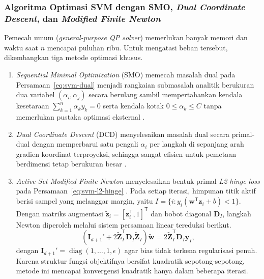 \subsubsection{Algoritma Optimasi SVM dengan SMO, \textit{Dual Coordinate Descent}, dan \textit{Modified Finite Newton}}

Pemecah umum (\textit{general-purpose QP solver}) memerlukan banyak memori dan waktu saat $n$ mencapai puluhan ribu. Untuk mengatasi beban tersebut, dikembangkan tiga metode optimasi khusus.
\begin{enumerate}
    \item \textit{Sequential Minimal Optimization} (SMO) memecah masalah dual pada Persamaan~\eqref{eq:svm-dual} menjadi rangkaian submasalah analitik berukuran dua variabel $(\alpha_i, \alpha_j)$ secara berulang sambil mempertahankan kendala kesetaraan $\sum_{k=1}^n \alpha_k y_k = 0$ serta kendala kotak $0 \le \alpha_k \le C$ tanpa memerlukan pustaka optimasi eksternal \cite{platt1998smo}.
    \item \textit{Dual Coordinate Descent} (DCD) menyelesaikan masalah dual secara primal-dual dengan memperbarui satu pengali $\alpha_i$ per langkah di sepanjang arah gradien koordinat terproyeksi, sehingga sangat efisien untuk pemetaan berdimensi tetap berukuran besar \cite{hsieh2008dcd}.
    \item \textit{Active-Set Modified Finite Newton} menyelesaikan bentuk primal \textit{L2-hinge loss} pada Persamaan~\eqref{eq:svm-l2-hinge} \cite{keerthi2005newton}. Pada setiap iterasi, himpunan titik aktif berisi sampel yang melanggar margin, yaitu $I = \{i : y_i (\mathbf{w}^{\mathsf{T}}\mathbf{z}_i + b) < 1\}$. Dengan matriks augmentasi $\tilde{\mathbf{z}}_i = [\mathbf{z}_i^{\mathsf{T}}, 1]^{\mathsf{T}}$ dan bobot diagonal $\mathbf{D}_I$, langkah Newton diperoleh melalui sistem persamaan linear tereduksi berikut.
    \begin{equation}
        \left(\mathbf{I}_{d+1}' + 2 \tilde{\mathbf{Z}}_I^{\mathsf{T}} \mathbf{D}_I \tilde{\mathbf{Z}}_I\right) \tilde{\mathbf{w}} = 2 \tilde{\mathbf{Z}}_I^{\mathsf{T}} \mathbf{D}_I \mathbf{y}_I,
        \label{eq:svm-newton-step}
    \end{equation}
    dengan $\mathbf{I}_{d+1}' = \operatorname{diag}(1, \ldots, 1, \epsilon)$ agar bias tidak terkena regularisasi penuh. Karena struktur fungsi objektifnya bersifat kuadratik sepotong-sepotong, metode ini mencapai konvergensi kuadratik hanya dalam beberapa iterasi.
\end{enumerate}

